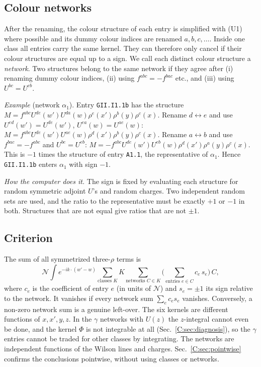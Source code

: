 \documentclass[10pt]{article}
\numberwithin{equation}{section}
\newcommand{\NN}{\mathcal N}
\newcommand{\lab}[1]{\texttt{#1}}
\begin{document}
\subsection{Colour networks}\label{C:sec:colour}
After the renaming, the colour structure of each entry is simplified with (U1) where possible and its dummy colour indices are renamed $a,b,c,\dots$. Inside one class all entries carry the same kernel. They can therefore only cancel if their colour structures are equal up to a sign. We call each distinct colour structure a \emph{network}. Two structures belong to the same network if they agree after (i) renaming dummy colour indices, (ii) using $f^{abc}=-f^{bac}$ etc., and (iii) using $U^{bc}=U^{cb}$.

\emph{Example} (network $\alpha_1$). Entry \lab{GII.I1.1b} has the structure $M=f^{abc}U^{de}(w')U^{da}(w)\rho^e(x')\rho^b(y)\rho^c(x)$. Rename $d\leftrightarrow e$ and use $U^{ed}(w')=U^{de}(w')$, $U^{ea}(w)=U^{ae}(w)$: $M=f^{abc}U^{de}(w')U^{ae}(w)\rho^d(x')\rho^b(y)\rho^c(x)$. Rename $a\leftrightarrow b$ and use $f^{bac}=-f^{abc}$ and $U^{be}=U^{eb}$: $M=-f^{abc}U^{de}(w')U^{eb}(w)\rho^d(x')\rho^a(y)\rho^c(x)$. This is $-1$ times the structure of entry \lab{A1.1}, the representative of $\alpha_1$. Hence \lab{GII.I1.1b} enters $\alpha_1$ with sign $-1$.

\emph{How the computer does it.} The sign is fixed by evaluating each structure for random symmetric adjoint $U$'s and random charges. Two independent random sets are used, and the ratio to the representative must be exactly $+1$ or $-1$ in both. Structures that are not equal give ratios that are not $\pm1$.

\subsection{Criterion}\label{C:sec:criterion}
The sum of all symmetrized three-$\rho$ terms is
\begin{equation}
\NN\int e^{-ik\cdot(w'-w)}\sum_{\text{classes }K}K\sum_{\text{networks }C\in K}\Big(\sum_{\text{entries }e\in C}c_e\,s_e\Big)\,C,
\end{equation}
where $c_e$ is the coefficient of entry $e$ (in units of $\NN$) and $s_e=\pm1$ its sign relative to the network. It vanishes if every network sum $\sum_e c_es_e$ vanishes. Conversely, a non-zero network sum is a genuine left-over. The six kernels are different functions of $x,x',y,z$. In the $\gamma$ networks with $U(z)$ the $z$-integral cannot even be done, and the kernel $\Phi$ is not integrable at all (Sec.~\ref{C:sec:diagnosis}), so the $\gamma$ entries cannot be traded for other classes by integrating. The networks are independent functions of the Wilson lines and charges. Sec.~\ref{C:sec:pointwise} confirms the conclusions pointwise, without using classes or networks.
\end{document}
